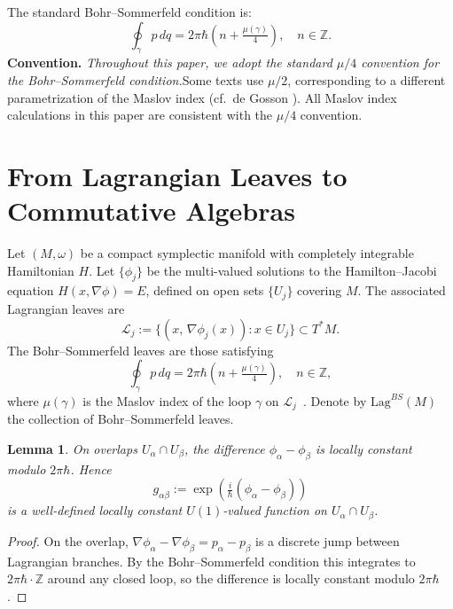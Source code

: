 \documentclass[11pt]{article}
\newtheorem{lemma}[theorem]{Lemma}
\begin{document}
The standard Bohr--Sommerfeld condition \cite[Eq.~(7.20)]{BW97} is:
\[
  \oint_\gamma p\,dq = 2\pi\hbar\!\left(n + \tfrac{\mu(\gamma)}{4}\right),
  \quad n \in \mathbb{Z}.
\]
\textbf{Convention.} \emph{Throughout this paper, we adopt the standard
$\mu/4$ convention for the Bohr--Sommerfeld condition.}\linebreak Some texts use
$\mu/2$, corresponding to a different parametrization of the Maslov index
(cf.\ de Gosson \cite{Gos11}). All Maslov index calculations in this
paper are consistent with the $\mu/4$ convention.

\section{From Lagrangian Leaves to Commutative Algebras}

Let $(M, \omega)$ be a compact symplectic manifold with completely
integrable Hamiltonian $H$. Let $\{\phi_j\}$ be the multi-valued
solutions to the Hamilton--Jacobi equation $H(x, \nabla\phi) = E$,
defined on open sets $\{U_j\}$ covering $M$. The associated Lagrangian
leaves are
\[
\mathcal{L}_j := \{(x,\, \nabla\phi_j(x)) : x \in U_j\} \subset T^*M.
\]
The Bohr--Sommerfeld leaves are those satisfying
\[
\oint_{\gamma} p\,dq
  = 2\pi\hbar\!\left(n + \tfrac{\mu(\gamma)}{4}\right), \quad n \in \mathbb{Z},
\]
where $\mu(\gamma)$ is the Maslov index of the loop $\gamma$ on
$\mathcal{L}_j$~\cite{Mas72, BW97}. Denote by $\mathrm{Lag}^{BS}(M)$
the collection of Bohr--Sommerfeld leaves.

\begin{lemma}\label{lem:HJ-constant}
On overlaps $U_\alpha \cap U_\beta$, the difference
$\phi_\alpha - \phi_\beta$ is locally constant modulo $2\pi\hbar$.
Hence
\[
g_{\alpha\beta} :=
  \exp\!\left(\tfrac{i}{\hbar}(\phi_\alpha - \phi_\beta)\right)
\]
is a well-defined locally constant $U(1)$-valued function on
$U_\alpha \cap U_\beta$.
\end{lemma}

\begin{proof}
On the overlap, $\nabla\phi_\alpha - \nabla\phi_\beta = p_\alpha - p_\beta$
is a discrete jump between Lagrangian branches. By the Bohr--Sommerfeld
condition this integrates to $2\pi\hbar\cdot\mathbb{Z}$ around any closed
loop, so the difference is locally constant modulo $2\pi\hbar$.
\end{proof}
\end{document}
